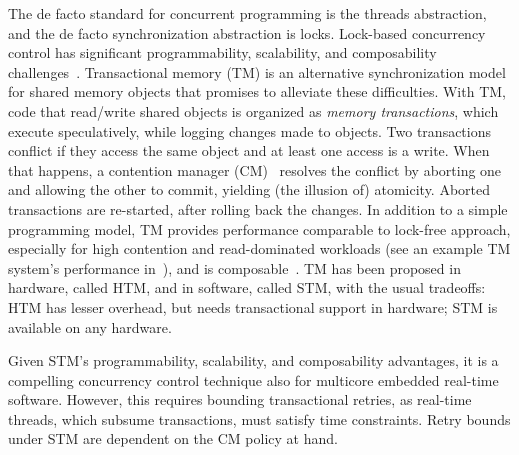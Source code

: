 \documentclass[conference,letterpaper]{IEEEtran}
\begin{document}
The de facto standard for concurrent programming is the threads abstraction, and the 
de facto synchronization abstraction is locks. Lock-based concurrency control has significant programmability, scalability, and composability challenges~\cite{Herlihy:2006:AMP:1146381.1146382}. Transactional memory (TM) is an alternative synchronization model for shared memory objects that promises to alleviate these difficulties. With TM, code that read/write shared objects is organized as \textit{memory transactions}, which execute speculatively, while logging changes made to objects. Two transactions conflict if they access the same object and at least one access is a write. When that happens, a contention manager (CM)~\cite{Guerraoui:2005:TTT:1073814.1073863} resolves the conflict by aborting one and allowing the other to commit, yielding (the illusion of) atomicity. Aborted transactions are re-started, after rolling back the changes. In addition to a simple programming model, TM provides performance comparable to lock-free approach, especially for high contention and read-dominated workloads (see an example TM system's performance in~\cite{Saha:2006:MHP:1122971.1123001}), and is composable~\cite{Harris:2005:CMT:1065944.1065952}. TM has been proposed in hardware, called HTM, and in software, called STM, with the usual tradeoffs: HTM has lesser overhead, but needs transactional support in hardware; STM is available on any hardware.

Given STM's programmability, scalability, and composability advantages, it is a compelling concurrency control technique also for multicore embedded real-time software. However, this requires  bounding transactional  retries, as real-time threads, which subsume transactions, must satisfy time constraints.  Retry bounds under STM are dependent on the CM policy at hand. 
\end{document}
